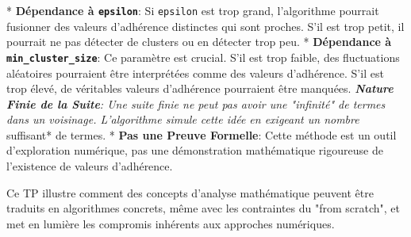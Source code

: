 \documentclass{report}
\begin{document}
*   \textbf{Dépendance à \texttt{epsilon}}: Si \texttt{epsilon} est trop grand, l'algorithme pourrait fusionner des valeurs d'adhérence distinctes qui sont proches. S'il est trop petit, il pourrait ne pas détecter de clusters ou en détecter trop peu.
*   \textbf{Dépendance à \texttt{min\_cluster\_size}}: Ce paramètre est crucial. S'il est trop faible, des fluctuations aléatoires pourraient être interprétées comme des valeurs d'adhérence. S'il est trop élevé, de véritables valeurs d'adhérence pourraient être manquées.
\textit{   \textbf{Nature Finie de la Suite}: Une suite finie ne peut pas avoir une "infinité" de termes dans un voisinage. L'algorithme simule cette idée en exigeant un nombre }suffisant* de termes.
*   \textbf{Pas une Preuve Formelle}: Cette méthode est un outil d'exploration numérique, pas une démonstration mathématique rigoureuse de l'existence de valeurs d'adhérence.

Ce TP illustre comment des concepts d'analyse mathématique peuvent être traduits en algorithmes concrets, même avec les contraintes du "from scratch", et met en lumière les compromis inhérents aux approches numériques.

\newpage
\end{document}
